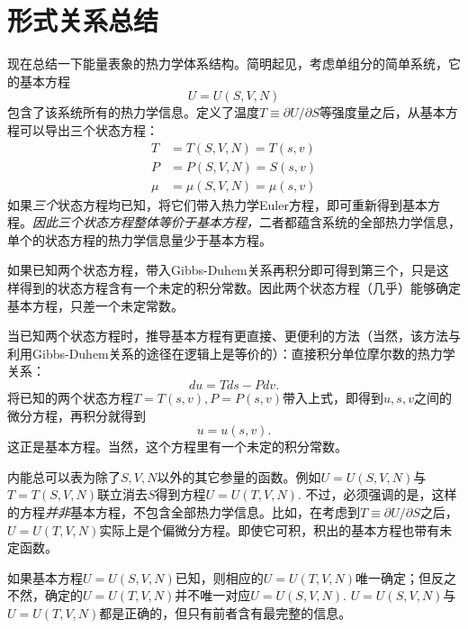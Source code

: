 \section{形式关系总结}
\label{sec3.3}
现在总结一下能量表象的热力学体系结构。简明起见，考虑单组分的简单系统，它的基本方程
\begin{equation}
\label{equ3.19}
    U = U(S, V, N)
\end{equation}
包含了该系统所有的热力学信息。定义了温度$T \equiv \partial U / \partial S$等强度量之后，从基本方程可以导出三个状态方程：
\begin{align}
    T &= T(S, V, N) = T(s, v) \label{equ3.20} \\
    P &= P(S, V, N) = S(s, v) \label{equ3.21} \\
    \mu &= \mu(S, V, N) = \mu(s, v) \label{equ3.22}
\end{align}
如果{\it 三个}状态方程均已知，将它们带入热力学Euler方程，即可重新得到基本方程。{\it 因此三个状态方程整体等价于基本方程，}二者都蕴含系统的全部热力学信息，单个的状态方程的热力学信息量少于基本方程。

如果已知两个状态方程，带入Gibbs-Duhem关系再积分即可得到第三个，只是这样得到的状态方程含有一个未定的积分常数。因此两个状态方程（几乎）能够确定基本方程，只差一个未定常数。

当已知两个状态方程时，推导基本方程有更直接、更便利的方法（当然，该方法与利用Gibbs-Duhem关系的途径在逻辑上是等价的）：直接积分单位摩尔数的热力学关系：
\begin{equation}
    du = Tds - Pdv.
\label{equ3.23}
\end{equation}
将已知的两个状态方程$T = T(s, v), P = P(s, v)$带入上式，即得到$u, s, v$之间的微分方程，再积分就得到
\begin{equation}
    u = u(s, v).
\label{equ3.24}
\end{equation}
这正是基本方程。当然，这个方程里有一个未定的积分常数。

内能总可以表为除了$S, V, N$以外的其它参量的函数。例如$U = U(S, V, N)$与$T = T(S, V, N)$联立消去$S$得到方程$U = U(T, V, N)$. 不过，必须强调的是，这样的方程{\it 并非}基本方程，不包含全部热力学信息。比如，在考虑到$T \equiv \partial U / \partial S$之后，$U = U(T, V, N)$实际上是个偏微分方程。即使它可积，积出的基本方程也带有未定函数。

如果基本方程$U = U(S, V, N)$已知，则相应的$U = U(T, V, N)$唯一确定；但反之不然，确定的$U = U(T, V, N)$并不唯一对应$U = U(S, V, N)$. {\color{red}{ Associated with every equation there is both a truth value and
an informational content.} } $U = U(S, V, N)$与$U = U(T, V, N)$都是正确的，但只有前者含有最完整的信息。  

